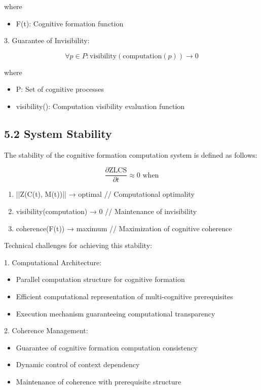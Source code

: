 \documentclass{article}
\begin{document}
where
\begin{itemize}
    \item F(t): Cognitive formation function
\end{itemize}

3. Guarantee of Invisibility:

$$
\forall p \in P : \text{visibility}(\text{computation}(p)) \rightarrow 0
$$

where
\begin{itemize}
    \item P: Set of cognitive processes
    \item visibility(): Computation visibility evaluation function
\end{itemize}

\subsection{5.2 System Stability}

The stability of the cognitive formation computation system is defined as follows:

$$
\frac{\partial \text{ZLCS}}{\partial t} \approx 0 \text{ when}
$$

\begin{enumerate}
    \item ||Z(C(t), M(t))|| → optimal // Computational optimality
    \item visibility(computation) → 0 // Maintenance of invisibility
    \item coherence(F(t)) → maximum // Maximization of cognitive coherence
\end{enumerate}

Technical challenges for achieving this stability:

1. Computational Architecture:
   \begin{itemize}
       \item Parallel computation structure for cognitive formation
       \item Efficient computational representation of multi-cognitive prerequisites
       \item Execution mechanism guaranteeing computational transparency
   \end{itemize}

2. Coherence Management:
   \begin{itemize}
       \item Guarantee of cognitive formation computation consistency
       \item Dynamic control of context dependency
       \item Maintenance of coherence with prerequisite structure
   \end{itemize}
\end{document}

